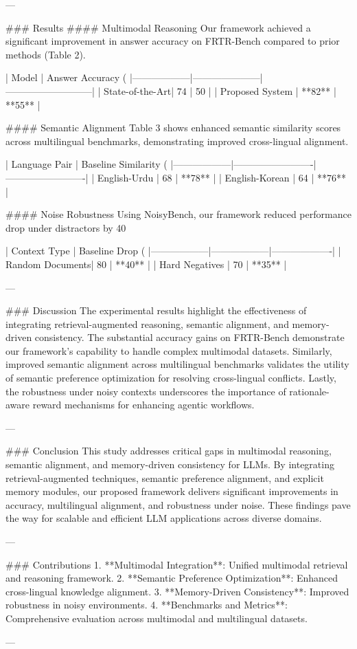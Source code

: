 ---

### Results  
#### Multimodal Reasoning  
Our framework achieved a significant improvement in answer accuracy on FRTR-Bench compared to prior methods (Table 2).  

| Model           | Answer Accuracy (%
|------------------|---------------------|---------------------------|
| State-of-the-Art| 74                 | 50                        |
| Proposed System | **82**             | **55**                    |

#### Semantic Alignment  
Table 3 shows enhanced semantic similarity scores across multilingual benchmarks, demonstrating improved cross-lingual alignment.  

| Language Pair   | Baseline Similarity (%
|------------------|-------------------------|-------------------------|
| English-Urdu    | 68                     | **78**                 |
| English-Korean  | 64                     | **76**                 |

#### Noise Robustness  
Using NoisyBench, our framework reduced performance drop under distractors by 40%

| Context Type    | Baseline Drop (%
|------------------|------------------|-------------------|
| Random Documents| 80               | **40**           |
| Hard Negatives  | 70               | **35**           |

---

### Discussion  
The experimental results highlight the effectiveness of integrating retrieval-augmented reasoning, semantic alignment, and memory-driven consistency. The substantial accuracy gains on FRTR-Bench demonstrate our framework's capability to handle complex multimodal datasets. Similarly, improved semantic alignment across multilingual benchmarks validates the utility of semantic preference optimization for resolving cross-lingual conflicts. Lastly, the robustness under noisy contexts underscores the importance of rationale-aware reward mechanisms for enhancing agentic workflows.

---

### Conclusion  
This study addresses critical gaps in multimodal reasoning, semantic alignment, and memory-driven consistency for LLMs. By integrating retrieval-augmented techniques, semantic preference alignment, and explicit memory modules, our proposed framework delivers significant improvements in accuracy, multilingual alignment, and robustness under noise. These findings pave the way for scalable and efficient LLM applications across diverse domains.

---

### Contributions  
1. **Multimodal Integration**: Unified multimodal retrieval and reasoning framework.  
2. **Semantic Preference Optimization**: Enhanced cross-lingual knowledge alignment.  
3. **Memory-Driven Consistency**: Improved robustness in noisy environments.  
4. **Benchmarks and Metrics**: Comprehensive evaluation across multimodal and multilingual datasets.

---